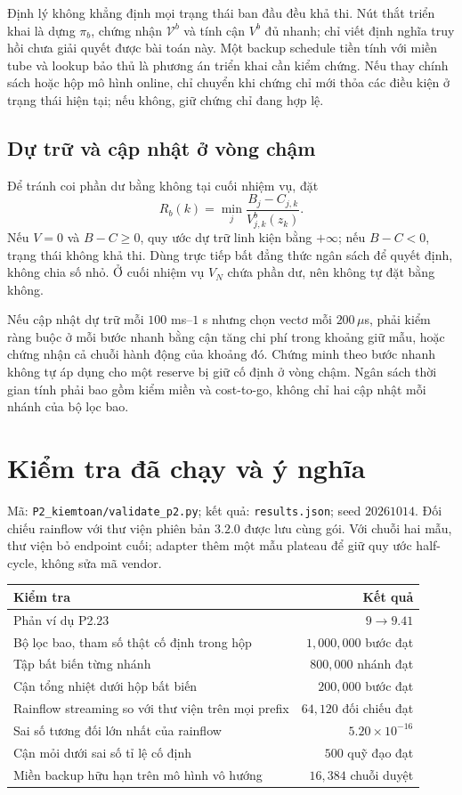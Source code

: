 \documentclass[11pt,a4paper]{article}
\begin{document}
Định lý không khẳng định mọi trạng thái ban đầu đều khả thi. Nút thắt triển khai là dựng $\pi_b$, chứng nhận $\mathcal V^b$ và tính cận $V^b$ đủ nhanh; chỉ viết định nghĩa truy hồi chưa giải quyết được bài toán này. Một backup schedule tiền tính với miền tube và lookup bảo thủ là phương án triển khai cần kiểm chứng. Nếu thay chính sách hoặc hộp mô hình online, chỉ chuyển khi chứng chỉ mới thỏa các điều kiện ở trạng thái hiện tại; nếu không, giữ chứng chỉ đang hợp lệ.

\subsection{Dự trữ và cập nhật ở vòng chậm}
Để tránh coi phần dư bằng không tại cuối nhiệm vụ, đặt
\[
R_b(k)=\min_j\frac{B_j-C_{j,k}}{V_{j,k}^b(z_k)}.
\]
Nếu $V=0$ và $B-C\ge0$, quy ước dự trữ linh kiện bằng $+\infty$; nếu $B-C<0$, trạng thái không khả thi. Dùng trực tiếp bất đẳng thức ngân sách để quyết định, không chia số nhỏ. Ở cuối nhiệm vụ $V_N$ chứa phần dư, nên không tự đặt bằng không.

Nếu cập nhật dự trữ mỗi $100$ ms--$1$ s nhưng chọn vectơ mỗi $200\,\mu$s, phải kiểm ràng buộc ở mỗi bước nhanh bằng cận tăng chi phí trong khoảng giữ mẫu, hoặc chứng nhận cả chuỗi hành động của khoảng đó. Chứng minh theo bước nhanh không tự áp dụng cho một reserve bị giữ cố định ở vòng chậm. Ngân sách thời gian tính phải bao gồm kiểm miền và cost-to-go, không chỉ hai cập nhật mỗi nhánh của bộ lọc bao.

\section{Kiểm tra đã chạy và ý nghĩa}
Mã: \texttt{P2\_kiemtoan/validate\_p2.py}; kết quả: \texttt{results.json}; seed $20261014$. Đối chiếu rainflow với thư viện phiên bản $3.2.0$ được lưu cùng gói. Với chuỗi hai mẫu, thư viện bỏ endpoint cuối; adapter thêm một mẫu plateau để giữ quy ước half-cycle, không sửa mã vendor.

\begin{center}\small
\begin{tabular}{p{8.5cm}r}
\toprule
Kiểm tra & Kết quả \\
\midrule
Phản ví dụ P2.23 & $9\to9.41$ \\
Bộ lọc bao, tham số thật cố định trong hộp & $1{,}000{,}000$ bước đạt \\
Tập bất biến từng nhánh & $800{,}000$ nhánh đạt \\
Cận tổng nhiệt dưới hộp bất biến & $200{,}000$ bước đạt \\
Rainflow streaming so với thư viện trên mọi prefix & $64{,}120$ đối chiếu đạt \\
Sai số tương đối lớn nhất của rainflow & $5.20\times10^{-16}$ \\
Cận mỏi dưới sai số tỉ lệ cố định & $500$ quỹ đạo đạt \\
Miền backup hữu hạn trên mô hình vô hướng & $16{,}384$ chuỗi duyệt \\
\bottomrule
\end{tabular}
\end{center}
\end{document}

